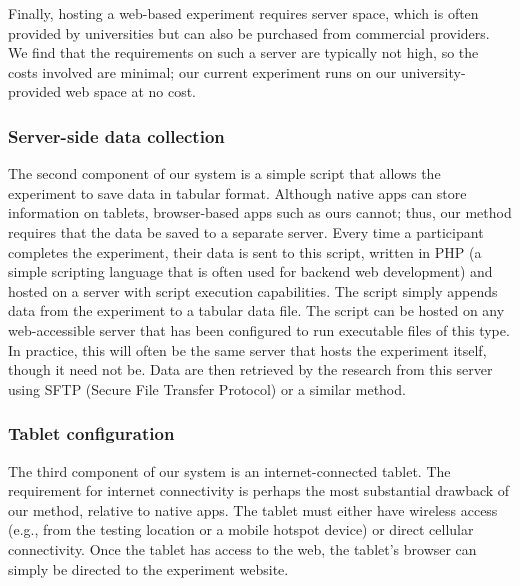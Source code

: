 \documentclass[man,noapacite]{apa2}
\begin{document}
Finally, hosting a web-based experiment requires server space, which is often provided by universities but can also be purchased from commercial providers. We find that the requirements on such a server are typically not high, so the costs involved are minimal; our current experiment runs on our university-provided web space at no cost.


\subsubsection{Server-side data collection}

The second component of our system is a simple script that allows the experiment to save data in tabular format. Although native apps can store information on tablets, browser-based apps such as ours cannot; thus, our method requires that the data be saved to a separate server. Every time a participant completes the experiment, their data is sent to this script, written in PHP (a simple scripting language that is often used for backend web development) and hosted on a server with script execution capabilities. The script simply appends data from the experiment to a tabular data file. The script can be hosted on any web-accessible server that has been configured to run executable files of this type. In practice, this will often be the same server that hosts the experiment itself, though it need not be. Data are then retrieved by the research from this server using SFTP (Secure File Transfer Protocol) or a similar method. 

\subsubsection{Tablet configuration}

The third component of our system is an internet-connected tablet. The requirement for internet connectivity is perhaps the most substantial drawback of our method, relative to native apps. The tablet must either have wireless access (e.g., from the testing location or a mobile hotspot device) or direct cellular connectivity. Once the tablet has access to the web, the tablet's browser can simply be directed to the experiment website. 
\end{document}
